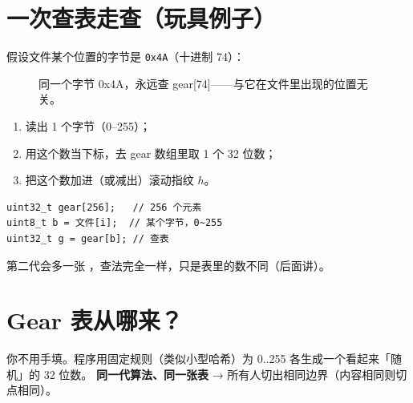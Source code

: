 \section{一次查表走查（玩具例子）}

假设文件某个位置的字节是 \texttt{0x4A}（十进制 74）：

\begin{figure}[htbp]
\centering
{}
\caption{同一个字节 0x4A，永远查 gear{[74]}——与它在文件里出现的位置无关。}
\end{figure}

\begin{stepbox}
\begin{enumerate}[nosep]
  \item 读出 1 个字节（0--255）；
  \item 用这个数当下标，去 gear 数组里取 1 个 32 位数；
  \item 把这个数加进（或减出）滚动指纹 $h$。
\end{enumerate}
\end{stepbox}

\begin{beginnerbox}[和代码的对应]
\begin{lstlisting}
uint32_t gear[256];   // 256 个元素
uint8_t b = 文件[i];  // 某个字节，0~255
uint32_t g = gear[b]; // 查表
\end{lstlisting}
第二代会多一张 ，查法完全一样，只是表里的数不同（后面讲）。
\end{beginnerbox}

\section{Gear 表从哪来？}

你不用手填。程序用固定规则（类似小型哈希）为 0..255 各生成一个看起来「随机」的 32 位数。  
\textbf{同一代算法、同一张表} → 所有人切出相同边界（内容相同则切点相同）。

